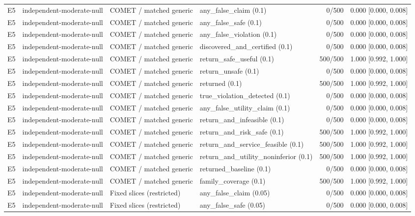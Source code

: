 \begin{longtable}{p{.04\linewidth}p{.18\linewidth}p{.19\linewidth}p{.16\linewidth}r p{.21\linewidth}}
E5 & independent-moderate-null & COMET / matched generic & any\_false\_claim (0.1) & 0/500 & 0.000 [0.000, 0.008]\\
E5 & independent-moderate-null & COMET / matched generic & any\_false\_safe (0.1) & 0/500 & 0.000 [0.000, 0.008]\\
E5 & independent-moderate-null & COMET / matched generic & any\_false\_violation (0.1) & 0/500 & 0.000 [0.000, 0.008]\\
E5 & independent-moderate-null & COMET / matched generic & discovered\_and\_certified (0.1) & 0/500 & 0.000 [0.000, 0.008]\\
E5 & independent-moderate-null & COMET / matched generic & return\_safe\_useful (0.1) & 500/500 & 1.000 [0.992, 1.000]\\
E5 & independent-moderate-null & COMET / matched generic & return\_unsafe (0.1) & 0/500 & 0.000 [0.000, 0.008]\\
E5 & independent-moderate-null & COMET / matched generic & returned (0.1) & 500/500 & 1.000 [0.992, 1.000]\\
E5 & independent-moderate-null & COMET / matched generic & true\_violation\_detected (0.1) & 0/500 & 0.000 [0.000, 0.008]\\
E5 & independent-moderate-null & COMET / matched generic & any\_false\_utility\_claim (0.1) & 0/500 & 0.000 [0.000, 0.008]\\
E5 & independent-moderate-null & COMET / matched generic & return\_and\_infeasible (0.1) & 0/500 & 0.000 [0.000, 0.008]\\
E5 & independent-moderate-null & COMET / matched generic & return\_and\_risk\_safe (0.1) & 500/500 & 1.000 [0.992, 1.000]\\
E5 & independent-moderate-null & COMET / matched generic & return\_and\_service\_feasible (0.1) & 500/500 & 1.000 [0.992, 1.000]\\
E5 & independent-moderate-null & COMET / matched generic & return\_and\_utility\_noninferior (0.1) & 500/500 & 1.000 [0.992, 1.000]\\
E5 & independent-moderate-null & COMET / matched generic & returned\_baseline (0.1) & 0/500 & 0.000 [0.000, 0.008]\\
E5 & independent-moderate-null & COMET / matched generic & family\_coverage (0.1) & 500/500 & 1.000 [0.992, 1.000]\\
E5 & independent-moderate-null & Fixed slices (restricted) & any\_false\_claim (0.05) & 0/500 & 0.000 [0.000, 0.008]\\
E5 & independent-moderate-null & Fixed slices (restricted) & any\_false\_safe (0.05) & 0/500 & 0.000 [0.000, 0.008]\\

\end{longtable}

